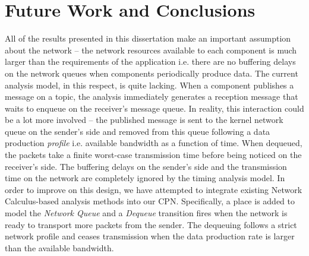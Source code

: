\chapter{Future Work and Conclusions}

All of the results presented in this dissertation make an important assumption about the network -- the network resources available to each component is much larger than the requirements of the application i.e. there are no buffering delays on the network queues when components periodically produce data. The current analysis model, in this respect, is quite lacking. When a component publishes a message on a topic, the analysis immediately generates a reception message that waits to enqueue on the receiver's message queue. In reality, this interaction could be a lot more involved -- the published message is sent to the kernel network queue on the sender's side and removed from this queue following a data production \emph{profile} i.e. available bandwidth as a function of time. When dequeued, the packets take a finite worst-case transmission time before being noticed on the receiver's side. The buffering delays on the sender's side and the transmission time on the network are completely ignored by the timing analysis model. In order to improve on this design, we have attempted to integrate existing Network Calculus-based analysis methods \cite{ISIS_F6_CYPHY:14} into our CPN. Specifically, a place is added to model the \emph{Network Queue} and a \emph{Dequeue} transition fires when the network is ready to transport more packets from the sender. The dequeuing follows a strict network profile and ceases transmission when the data production rate is larger than the available bandwidth. 

